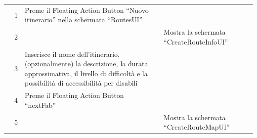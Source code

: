 \documentclass{natourDoc}
\begin{document}
\begin{tabularx}{\linewidth}{| l | p{1cm} | p{4cm} | X | X|}
	\cline{2-5}                   & 1                                                                                                                                      & Preme il Floating Action Button “Nuovo itinerario” nella schermata “RoutesUI”
	                              &                                                                                                                                        &                                                                                                                                                                                                                                                                                                                    \\

	\cline{2-5}                   & 2                                                                                                                                      &                                                                                                                                                                      & Mostra la schermata “CreateRouteInfoUI”             &                                                                                       \\

	\cline{2-5}                   & 3                                                                                                                                      & Inserisce il nome dell’itinerario, (opzionalmente) la descrizione, la durata approssimativa, il livello di difficoltà e la possibilità di accessibilità per disabili &                                                     &                                                                                       \\

	\cline{2-5}                   & 4                                                                                                                                      & Preme il Floating Action Button “nextFab”                                                                                                                            &                                                     &                                                                                       \\

	\cline{2-5}                   & 5                                                                                                                                      &                                                                                                                                                                      & Mostra la schermata “CreateRouteMapUI”              &                                                                                       \\


\end{tabularx}
\end{document}
